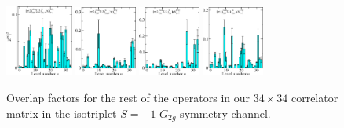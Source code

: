 \begin{figure}[H]
    \centering
    \includegraphics[width=0.1975\textwidth]{figures/sigmas/g2g/zfactors/zfactor_isotriplet_pion_sigma-G2g_1-P011-A2m-SS_0-P0-1-1-G-SS_17.pdf}
    \includegraphics[width=0.18\textwidth]{figures/sigmas/g2g/zfactors/zfactor_isotriplet_pion_sigma-G2g_1-P011-A2m-SS_0-P0-1-1-G-SS_18.pdf}
    \includegraphics[width=0.18\textwidth]{figures/sigmas/g2g/zfactors/zfactor_isotriplet_pion_sigma-G2g_1-P011-A2m-SS_1-P0-1-1-G-SS_1.pdf}
    \includegraphics[width=0.18\textwidth]{figures/sigmas/g2g/zfactors/zfactor_isotriplet_pion_sigma-G2g_1-P111-A2m-SS_0-P-1-1-1-G-SS_4.pdf}
    \caption{Overlap factors for the rest of the operators in our $34\times 34$ correlator matrix in the isotriplet $S=-1$ $G_{2g}$ symmetry channel.}\label{fig:g2g_zfactors2}
\end{figure}

